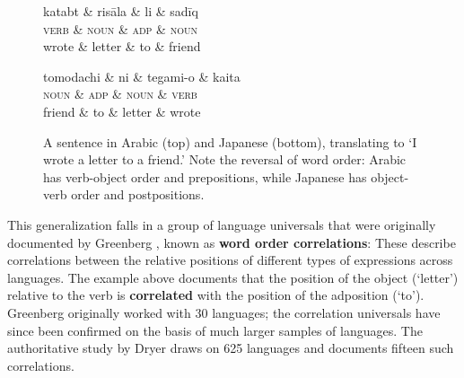 \documentclass[9pt,twocolumn,twoside,lineno]{pnas-new}
\newcommand{\key}[1]{\textbf{#1}}
\begin{document}
\begin{figure}
\centering
\begin{dependency}[theme = simple]
   \begin{deptext}[column sep=1em]
	   katabt \& risāla \& li \& sadīq  \\
	   \textsc{verb} \& \textsc{noun} \& \textsc{adp} \& \textsc{noun} \\
	   wrote \& letter   \& to \& friend  \\
   \end{deptext}
\end{dependency}
\begin{dependency}[theme = simple]
   \begin{deptext}[column sep=1em]
      tomodachi \& ni \& tegami-o \& kaita \\
 \textsc{noun} \& \textsc{adp} \& \textsc{noun} \& \textsc{verb}\\
	   friend \& to \& letter  \& wrote \\
   \end{deptext}
\end{dependency}

	\caption{A sentence in Arabic (top) and Japanese (bottom), translating to `I wrote a letter to a friend.' Note the reversal of word order: Arabic has verb-object order and prepositions, while Japanese has object-verb order and postpositions.}\label{fig:arabic-japanese-simple}
\end{figure}





This generalization falls in a group of language universals that were originally documented by Greenberg \cite{greenberg1963universals}, known as \key{word order correlations}:
These describe correlations between the relative positions of different types of expressions across languages.
The example above documents that the position of the object (`letter') relative to the verb is \key{correlated} with the position of the adposition (`to'). %
Greenberg originally worked with 30 languages; the correlation universals have since been confirmed on the basis of much larger samples of languages.
The authoritative study by Dryer \cite{dryer1992greenbergian} draws on 625 languages and documents fifteen such correlations.
\end{document}

